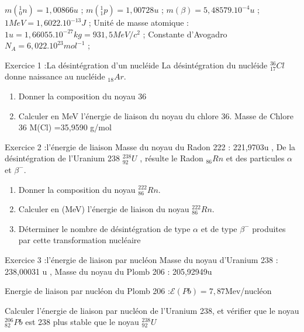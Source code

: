\documentclass[12pt, french]{article}
\begin{document}
\begin{center}
\end{center}


\vspace{-0.2cm}
$m(_0^1n)=1,00866u$ ; $m(_1^1p)=1,00728u$ ; $m(\beta)=5,48579.10^{-4}u$ ; $1MeV=1,6022.10^{-13}J$ ; Unité de masse atomique : $1u = 1,66055.10^{-27} kg=931,5MeV/c^2$ ; Constante d’Avogadro $N_A = 6,022.10^{23} mol^{-1}$ ;
   \begin{Box2}{Exercice 1 :La désintégration d'un nucléide  }
La désintégration du nucléide $^{36}_{17}Cl$ donne naissance au nucléide $_{18}Ar$.
\begin{enumerate}
	\item Donner la composition du noyau 36
	\item Calculer en MeV l’énergie de liaison du noyau du chlore 36. Masse de Chlore 36 M(Cl) =35,9590 g/mol
\end{enumerate}
   \end{Box2}


\begin{Box2}{Exercice 2 :l’énergie de liaison}
Masse du noyau du Radon 222 : 221,9703u , De la désintégration de l’Uranium 238 $^{238}_{92}U$ , résulte le Radon $_{86}Rn$ et des particules $\alpha$ et $\beta^-$.
	\begin{enumerate}
		\item Donner la composition du noyau $^{222}_{86}Rn$.
		\item  Calculer en (MeV) l’énergie de liaison du noyau $^{222}_{86}Rn$.
		\item  Déterminer le nombre de désintégration de type $\alpha$ et de type $\beta^-$ produites par cette transformation nucléaire
	\end{enumerate}
\end{Box2}


\begin{Box2}{Exercice 3 :l’énergie de liaison par nucléon }
Masse du noyau d’Uranium 238 : 238,00031 u , Masse du noyau du Plomb 206 : 205,92949u

Energie de liaison par nucléon du Plomb 206 :$\mathscr{E}(Pb) = 7,87$Mev/nucléon

Calculer l’énergie de liaison par nucléon de l’Uranium 238, et vérifier que le noyau $^{206}_{82}Pb$ est 238 plus stable que le noyau $^{238}_{92}U$


\end{Box2}
\end{document}
